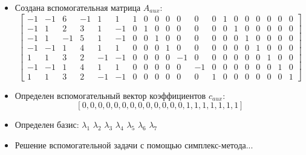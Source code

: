 \begin{itemize}
\subsection*{Поиск начального базиса методом введения искуственных переменных.}
\item Создана вспомогательная матрица $A_{aux}$:
$$\left[\begin{array}{cccccccccccccccccccc}-1 & -1 & 6 & -1 & 1 & 1 & 1 & 0 & 0 & 0 & 0 & 0 & 0 & 1 & 0 & 0 & 0 & 0 & 0 & 0\\-1 & 1 & 2 & 3 & 1 & -1 & 0 & 1 & 0 & 0 & 0 & 0 & 0 & 0 & 1 & 0 & 0 & 0 & 0 & 0\\-1 & 1 & -1 & 5 & 1 & -1 & 0 & 0 & 1 & 0 & 0 & 0 & 0 & 0 & 0 & 1 & 0 & 0 & 0 & 0\\-1 & -1 & 1 & 4 & 1 & 1 & 0 & 0 & 0 & 1 & 0 & 0 & 0 & 0 & 0 & 0 & 1 & 0 & 0 & 0\\1 & 1 & 3 & 2 & -1 & -1 & 0 & 0 & 0 & 0 & -1 & 0 & 0 & 0 & 0 & 0 & 0 & 1 & 0 & 0\\-1 & -1 & 1 & 4 & 1 & 1 & 0 & 0 & 0 & 0 & 0 & -1 & 0 & 0 & 0 & 0 & 0 & 0 & 1 & 0\\1 & 1 & 3 & 2 & -1 & -1 & 0 & 0 & 0 & 0 & 0 & 0 & 1 & 0 & 0 & 0 & 0 & 0 & 0 & 1\end{array}\right]$$
\item Определен вспомогательный вектор коэффициентов $c_{aux}$:
$$[0, 0, 0, 0, 0, 0, 0, 0, 0, 0, 0, 0, 0, 1, 1, 1, 1, 1, 1, 1]$$
\item Определен базис:
$\lambda_1$
$\lambda_2$
$\lambda_3$
$\lambda_4$
$\lambda_5$
$\lambda_6$
$\lambda_7$
\item Решение вспомогательной задачи с помощью симплекс-метода...

\end{itemize}

